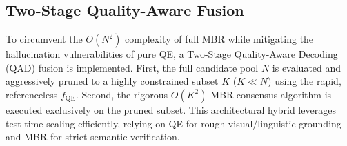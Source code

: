 \subsection{Two-Stage Quality-Aware Fusion}
To circumvent the $O(N^2)$ complexity of full MBR while mitigating the hallucination vulnerabilities of pure QE, a Two-Stage Quality-Aware Decoding (QAD) fusion is implemented. 
First, the full candidate pool $N$ is evaluated and aggressively pruned to a highly constrained subset $K$ ($K \ll N$) using the rapid, referenceless $f_{\text{QE}}$. Second, the rigorous $O(K^2)$ MBR consensus algorithm is executed exclusively on the pruned subset. This architectural hybrid leverages test-time scaling efficiently, relying on QE for rough visual/linguistic grounding and MBR for strict semantic verification.
